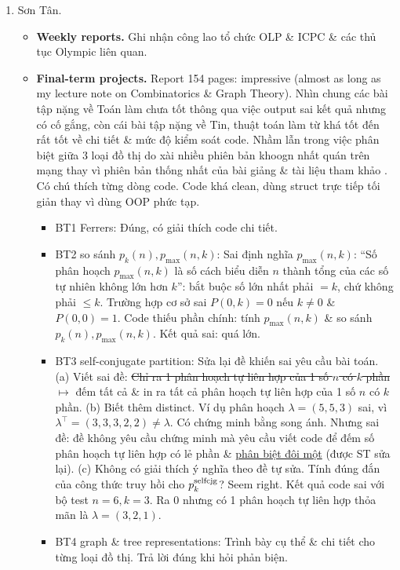\documentclass{article}
\begin{document}
\begin{enumerate}
\begin{itemize}
    \end{itemize}
    \item {\sc Sơn Tân.}
    \begin{itemize}
        \item {\bf Weekly reports.} Ghi nhận công lao tổ chức OLP \& ICPC \& các thủ tục Olympic liên quan.
        \item {\bf Final-term projects.} Report 154 pages: impressive (almost as long as my lecture note on Combinatorics \& Graph Theory). Nhìn chung các bài tập nặng về Toán làm chưa tốt thông qua việc output sai kết quả nhưng có cố gắng, còn cái bài tập nặng về Tin, thuật toán làm từ khá tốt đến rất tốt về chi tiết \& mức độ kiểm soát code. Nhầm lẫn trong việc phân biệt giữa 3 loại đồ thị do xài nhiều phiên bản khoogn nhất quán trên mạng thay vì phiên bản thống nhất của bài giảng \& tài liệu tham khảo \cite{Shahriari2022}. Có chú thích từng dòng code. Code khá clean, dùng struct trực tiếp tối giản thay vì dùng OOP phức tạp.
        \begin{itemize}
            \item BT1 Ferrers: Đúng, có giải thích code chi tiết. 
            \item BT2 so sánh $p_k(n),p_{\max}(n,k)$: Sai định nghĩa $p_{\max}(n,k)$: ``Số phân hoạch $p_{\max}(n,k)$ là số cách biểu diễn $n$ thành tổng của các số tự nhiên không lớn hơn $k$'': bắt buộc số lớn nhất phải $= k$, chứ không phải $\le k$. Trường hợp cơ sở sai $P(0,k) = 0$ nếu $k\ne0$ \& $P(0,0) = 1$. Code thiếu phần chính: tính $p_{\max}(n,k)$ \& so sánh $p_k(n),p_{\max}(n,k)$. Kết quả sai: quá lớn.
            \item BT3 self-conjugate partition: Sửa lại đề khiến sai yêu cầu bài toán. (a) Viết sai đề: \st{Chỉ ra 1 phân hoạch tự liên hợp của 1 số $n$ có $k$ phần} $\mapsto$ đếm tất cả \& in ra tất cả phân hoạch tự liên hợp của 1 số $n$ có $k$ phần. (b) Biết thêm distinct. Ví dụ phân hoạch $\lambda = (5,5,3)$ sai, vì $\lambda^\top = (3,3,3,2,2)\ne\lambda$. Có chứng minh bằng song ánh. Nhưng sai đề: đề không yêu cầu chứng minh mà yêu cầu viết code để đếm số phân hoạch tự liên hợp có lẻ phần \& \underline{phân biệt đôi một} (được ST sửa lại). (c) Không có giải thích ý nghĩa theo đề tự sửa. Tính đúng đắn của công thức truy hồi cho $p_k^{\rm selfcjg}$? Seem right. Kết quả code sai với bộ test $n = 6,k = 3$. Ra 0 nhưng có 1 phân hoạch tự liên hợp thỏa mãn là $\lambda = (3,2,1)$.
            \item BT4 graph \& tree representations: Trình bày cụ thể \& chi tiết cho từng loại đồ thị. Trả lời đúng khi hỏi phản biện.

\end{itemize}
\end{itemize}
\end{enumerate}
\end{document}
